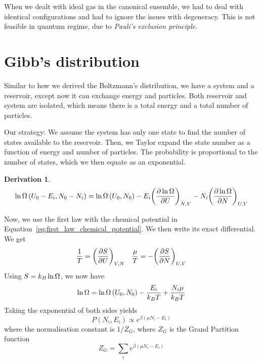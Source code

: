 \documentclass[12pt,chapterprefix=false,dvipsnames]{scrbook}
\theoremstyle{dotless}
\theoremstyle{definition}
\newtheorem{protoderivation}{Derivation}[section]
\newenvironment{derivation}
{\colorlet{shadecolor}{purple!15}\begin{shaded}\begin{protoderivation}}
			{\end{protoderivation}\end{shaded}}
\begin{document}
When we dealt with ideal gas in the canonical ensemble, we had
to deal with identical configurations and had to ignore the
issues with degeneracy. This is not feasible in quantum regime,
due to \textit{Pauli's exclusion principle}.

\section{Gibb's distribution}%
\label{sec:gibb_s_distribution}

Similar to how we derived the Boltzmann's distribution, we have
a system and a reservoir, except now it can exchange energy and
particles. Both reservoir and system are isolated, which means
there is a total energy and a total number of particles.

Our strategy: We assume the system has only one state to find
the number of states available to the reservoir. Then, we Taylor
expand the state number as a function of energy and number of
particles. The probability is proportional to the number of
states, which we then equate as an exponential.

\begin{derivation}
	\begin{equation}
		\naturallogarithm \Omega \left( U_0 - E_i, N_0 - N_i\right)
		=
		\naturallogarithm\Omega\left( U_0, N_0\right) - E_i
		{\left(\pdv{\naturallogarithm\Omega}{U}\right)}_{N,V} - N_i
		{\left(\pdv{\naturallogarithm\Omega}{N}\right)}_{U,V}
	\end{equation}

	Now, we use the first law with the chemical potential in
	Equation~\ref{eq:first_law_chemical_potential}. We then write its exact
	differential. We get
	\begin{equation}
		\frac{1}{T} = {\left(\pdv{S}{U}\right)}_{V,
		N}\hspace{1em} \frac{\mu}{T} =
		-{\left(\pdv{S}{N}\right)}_{U,V}
	\end{equation}
	Using $S = k_B \naturallogarithm\Omega$, we now have
	\begin{equation}
		\naturallogarithm\Omega =
		\naturallogarithm\Omega\left(U_0, N_0\right) -
		\frac{E_i}{k_B T} + \frac{N_i \mu}{k_B T}
	\end{equation}
	Taking the exponential of both sides yields
	\begin{equation}
        P\left(N_i, E_i\right)\propto e^{\beta
		\left(\mu N_i - E_i\right)}
	\end{equation}
	where the normalisation constant is $1/Z_G$,
	where $Z_G$ is the Grand Partition function
	\begin{equation}
        Z_G = \sum_i e^{\beta\left(\mu N_i - E_i \right)}
	\end{equation}
\end{derivation}
\end{document}
